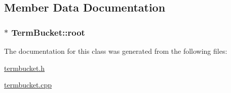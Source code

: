 \subsection{Member Data Documentation}
\hypertarget{class_term_bucket_afffcce881e1d712ca56bc535d9c9dc0f}{}
\subsubsection[{root}]{$\ast$ Term\+Bucket\+::root\hspace{0.3cm}{\ttfamily [private]}}\label{class_term_bucket_afffcce881e1d712ca56bc535d9c9dc0f}


The documentation for this class was generated from the following files\+:\begin{DoxyCompactItemize}
\item 
\hyperlink{termbucket_8h}{termbucket.\+h}\item 
\hyperlink{termbucket_8cpp}{termbucket.\+cpp}\end{DoxyCompactItemize}
